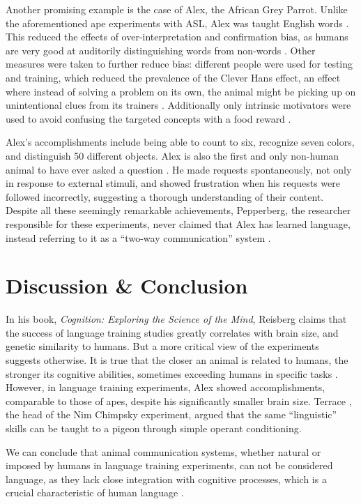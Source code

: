 \documentclass[a4paper,11pt]{article}
\begin{document}
  Another promising example is the case of Alex, the African Grey Parrot.
  Unlike the aforementioned ape experiments with ASL, Alex was taught English words \cite{wilson2021clever}.
  This reduced the effects of over-interpretation and confirmation bias,
  as humans are very good at auditorily distinguishing words from non-words \cite{connine1990word}.
  Other measures were taken to further reduce bias:
  different people were used for testing and training,
  which reduced the prevalence of the Clever Hans effect,
  an effect where instead of solving a problem on its own,
  the animal might be picking up on unintentional clues from its trainers \cite{cleverhanseffect}.
  Additionally only intrinsic motivators were used
  to avoid confusing the targeted concepts with a food reward \cite{wilson2021clever}.

  Alex's accomplishments include being able to count to six, recognize seven colors, and distinguish 50 different objects.
  Alex is also the first and only non-human animal to have ever asked a question \cite{jordania2006asked}.
  He made requests spontaneously, not only in response to external stimuli,
  and showed frustration when his requests were followed incorrectly,
  suggesting a thorough understanding of their content.
  Despite all these seemingly remarkable achievements,
  Pepperberg, the researcher responsible for these experiments,
  never claimed that Alex has learned language, instead referring to it as a ``two-way communication'' system \cite{wilson2021clever}.

  \section{Discussion \& Conclusion}
  In his book, \textit{Cognition: Exploring the Science of the Mind}, Reisberg \citeyear{thebook2}
  claims that the success of language training studies greatly correlates with brain size, and genetic similarity to humans.
  But a more critical view of the experiments suggests otherwise.
  It is true that the closer an animal is related to humans, the stronger its cognitive abilities,
  sometimes exceeding humans in specific tasks \cite{fitch2020animalcognition}.
  However, in language training experiments, Alex showed accomplishments, comparable to those of apes,
  despite his significantly smaller brain size.
  Terrace \citeyear{terrace1983apes}, the head of the Nim Chimpsky experiment,
  argued that the same ``linguistic'' skills can be taught to a pigeon through simple operant conditioning.

  We can conclude that animal communication systems,
  whether natural or imposed by humans in language training experiments,
  can not be considered language, as they lack close integration with cognitive processes,
  which is a crucial characteristic of human language \cite{fitch2020animalcognition}.

  \nocite{ref2}
  
  
\end{document}
